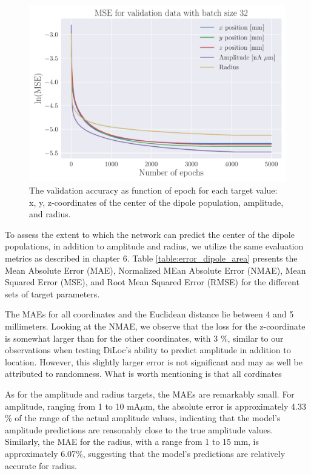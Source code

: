 \documentclass[a4paper, UKenglish, 11pt]{uiomaster}
\begin{document}
\begin{figure}[!htb]
    \centering
    \includegraphics[width=\linewidth]{figures/mse_targets_area_32_0.001_0.35_0.1_0.0_5000_(0).pdf}
    \caption{The validation accuracy as function of epoch for each target value: x, y, z-coordinates of the center of the dipole population, amplitude, and radius. }
    \label{fig:dipole_area_target_result}
\end{figure}


To assess the extent to which the network can predict the center of the dipole populations, in addition to amplitude and radius, we utilize the same evaluation metrics as described in chapter 6. Table \ref{table:error_dipole_area} presents the Mean Absolute Error (MAE), Normalized MEan Absolute Error (NMAE), Mean Squared Error (MSE), and Root Mean Squared Error (RMSE) for the different sets of target parameters.

The MAEs for all coordinates and the Euclidean distance lie between 4 and 5 millimeters. Looking at the NMAE, we observe that the loss for the z-coordinate is somewhat larger than for the other coordinates, with 3 $\%$, similar to our observations when testing DiLoc's ability to predict amplitude in addition to location. However, this slightly larger error is not significant and may as well be attributed to randomness. What is worth mentioning is that all cordinates 


As for the amplitude and radius targets, the MAEs are remarkably small. For amplitude, ranging from 1 to 10 mA$\mu$m, the absolute error is approximately 4.33$\%$ of the range of the actual amplitude values, indicating that the model's amplitude predictions are reasonably close to the true amplitude values. Similarly, the MAE for the radius, with a range from 1 to 15 mm, is approximately 6.07$\%$, suggesting that the model's predictions are relatively accurate for radius.
\end{document}
